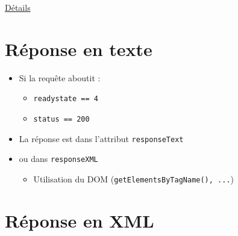 \href{http://blog.teamtreehouse.com/the-definitive-guide-to-get-vs-post}{Détails}

\hypertarget{ruxe9ponse-en-texte}{%
\section{Réponse en texte}\label{ruxe9ponse-en-texte}}

\begin{itemize}
\tightlist
\item
  Si la requête aboutit :

  \begin{itemize}
  \tightlist
  \item
    \textenglish{\texttt{readystate\ ==\ 4}}
  \item
    \textenglish{\texttt{status\ ==\ 200}}
  \end{itemize}
\item
  La réponse est dans l'attribut \textenglish{\texttt{responseText}}
\item
  ou dans \textenglish{\texttt{responseXML}}

  \begin{itemize}
  \tightlist
  \item
    Utilisation du DOM
    (\textenglish{\texttt{getElementsByTagName(),\ ...}})
  \end{itemize}
\end{itemize}

\hypertarget{ruxe9ponse-en-xml}{%
\section{Réponse en XML}\label{ruxe9ponse-en-xml}}

